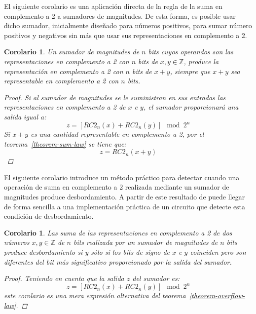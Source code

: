 \documentclass[spanish,a4paper,12pt,titlepage]{article}
\newtheorem{corollary}[theorem]{Corolario}
\theoremstyle{definition}
\theoremstyle{remark}
\newcommand{\bbZ}{\mathbb{Z}}
\begin{document}
El siguiente corolario es una aplicación directa de la regla de la suma en complemento a 2 a sumadores de magnitudes. De esta forma, es posible usar dicho sumador, inicialmente diseñado para números positivos, para sumar número positivos y negativos sin más que usar sus representaciones en complemento a 2.

\begin{corollary}
  Un sumador de magnitudes de $n$ bits cuyos operandos son las representaciones en complemento a 2 con $n$ bits de $x, y \in \bbZ$, produce la representación en complemento a 2 con $n$ bits de $x+y$, siempre que $x+y$ sea representable en complemento a 2 con $n$ bits.
  \begin{proof}
    Si al sumador de magnitudes se le suministran en sus entradas las representaciones en complemento a 2 de $x$ e $y$, el sumador proporcionará una salida igual a:
    \[
      z = [RC2_n(x)+RC2_n(y)] \mod 2^n
    \]
    Si $x+y$ es una cantidad representable en complemento a 2, por el teorema~\ref{theorem-sum-law} se tiene que:
    \[
      z = RC2_n(x + y)
    \]
  \end{proof}
\end{corollary}

El siguiente corolario introduce un método práctico para detectar cuando una operación de suma en complemento a 2 realizada mediante un sumador de magnitudes produce desbordamiento. A partir de este resultado de puede llegar de forma sencilla a una implementación práctica de un circuito que detecte esta condición de desbordamiento.

\begin{corollary}
  Las suma de las representaciones en complemento a 2 de dos números $x, y \in \bbZ$ de $n$ bits realizada por un sumador de magnitudes de $n$ bits produce desbordamiento si y sólo si los bits de signo de $x$ e $y$ coinciden pero son diferentes del bit más significativo proporcionado por la salida del sumador.
  \begin{proof}
    Teniendo en cuenta que la salida $z$ del sumador es:
    \[
      z = [RC2_n(x)+RC2_n(y)] \mod 2^n
    \]
    este corolario es una mera expresión alternativa del teorema~\ref{theorem-overflow-law}.
  \end{proof}
\end{corollary}

\end{document}
